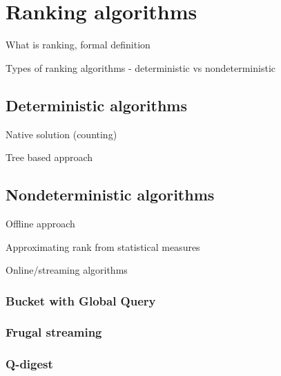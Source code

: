 \chapter{Ranking algorithms}

\begin{shaded}

  What is ranking, formal definition

  Types of ranking algorithms - deterministic vs nondeterministic

\end{shaded}

\section{Deterministic algorithms}

\begin{shaded}

  Native solution (counting)

  Tree based approach
  
\end{shaded}

\section{Nondeterministic algorithms}

\begin{shaded}
	Offline approach

  Approximating rank from statistical measures

  Online/streaming algorithms

\end{shaded}

\subsection{Bucket with Global Query}

\subsection{Frugal streaming}

\cite{frugal_streaming}

\subsection{Q-digest}
